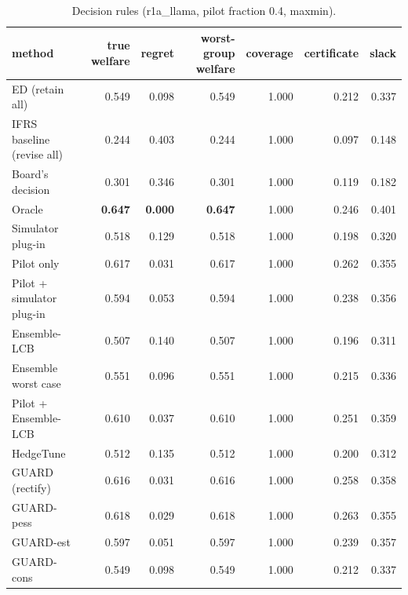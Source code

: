 \begin{table}[t]
\centering
\small
\begin{tabular}{lrrrrrr}
\toprule
method & true welfare & regret & worst-group welfare & coverage & certificate & slack \\
\midrule
ED (retain all) & 0.549 & 0.098 & 0.549 & 1.000 & 0.212 & 0.337 \\
IFRS baseline (revise all) & 0.244 & 0.403 & 0.244 & 1.000 & 0.097 & 0.148 \\
Board's decision & 0.301 & 0.346 & 0.301 & 1.000 & 0.119 & 0.182 \\
Oracle & \textbf{0.647} & \textbf{0.000} & \textbf{0.647} & 1.000 & 0.246 & 0.401 \\
Simulator plug-in & 0.518 & 0.129 & 0.518 & 1.000 & 0.198 & 0.320 \\
Pilot only & 0.617 & 0.031 & 0.617 & 1.000 & 0.262 & 0.355 \\
Pilot + simulator plug-in & 0.594 & 0.053 & 0.594 & 1.000 & 0.238 & 0.356 \\
Ensemble-LCB & 0.507 & 0.140 & 0.507 & 1.000 & 0.196 & 0.311 \\
Ensemble worst case & 0.551 & 0.096 & 0.551 & 1.000 & 0.215 & 0.336 \\
Pilot + Ensemble-LCB & 0.610 & 0.037 & 0.610 & 1.000 & 0.251 & 0.359 \\
HedgeTune & 0.512 & 0.135 & 0.512 & 1.000 & 0.200 & 0.312 \\
GUARD (rectify) & 0.616 & 0.031 & 0.616 & 1.000 & 0.258 & 0.358 \\
GUARD-pess & 0.618 & 0.029 & 0.618 & 1.000 & 0.263 & 0.355 \\
GUARD-est & 0.597 & 0.051 & 0.597 & 1.000 & 0.239 & 0.357 \\
GUARD-cons & 0.549 & 0.098 & 0.549 & 1.000 & 0.212 & 0.337 \\
\bottomrule
\end{tabular}
\caption{Decision rules (r1a\_llama, pilot fraction 0.4, maxmin).}
\label{tab:methods-maxmin}
\end{table}
